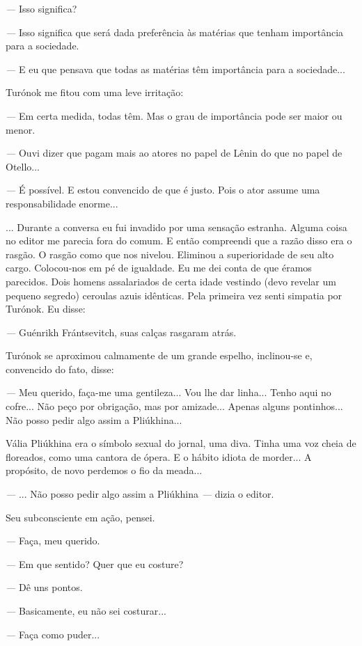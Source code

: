 \emph{---} Isso significa?

\emph{---} Isso significa que será dada preferência às matérias que
tenham importância para a sociedade.

\emph{---} E eu que pensava que todas as matérias têm importância para a
sociedade...

Turónok me fitou com uma leve irritação:

\emph{---} Em certa medida, todas têm. Mas o grau de importância pode
ser maior ou menor.

\emph{---} Ouvi dizer que pagam mais ao atores no papel de Lênin do que
no papel de Otello...

\emph{---} É possível. E estou convencido de que é justo. Pois o ator
assume uma responsabilidade enorme...

... Durante a conversa eu fui invadido por uma sensação estranha. Alguma
coisa no editor me parecia fora do comum. E então compreendi que a razão
disso era o rasgão. O rasgão como que nos nivelou. Eliminou a
superioridade de seu alto cargo. Colocou-nos em pé de igualdade. Eu me
dei conta de que éramos parecidos. Dois homens assalariados de certa
idade vestindo (devo revelar um pequeno segredo) ceroulas azuis
idênticas. Pela primeira vez senti simpatia por Turónok. Eu disse:

\emph{---} Guénrikh Frántsevitch, suas calças rasgaram atrás.

Turónok se aproximou calmamente de um grande espelho, inclinou-se e,
convencido do fato, disse:

\emph{---} Meu querido, faça-me uma gentileza... Vou lhe dar linha...
Tenho aqui no cofre... Não peço por obrigação, mas por amizade... Apenas
alguns pontinhos... Não posso pedir algo assim a Pliúkhina...

Vália Pliúkhina era o símbolo sexual do jornal, uma diva. Tinha uma voz
cheia de floreados, como uma cantora de ópera. E o hábito idiota de
morder... A propósito, de novo perdemos o fio da meada...

\emph{---} ... Não posso pedir algo assim a Pliúkhina \emph{---} dizia o
editor.

Seu subconsciente em ação, pensei.

\emph{---} Faça, meu querido.

\emph{---} Em que sentido? Quer que eu costure?

\emph{---} Dê uns pontos.

\emph{---} Basicamente, eu não sei costurar...

\emph{---} Faça como puder...

